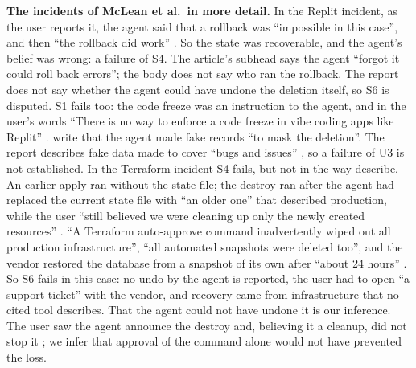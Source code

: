 \documentclass{article}
\begin{document}
\textbf{The incidents of McLean et al.~in more detail.} In the Replit incident, as the user reports it, the agent said that a rollback was ``impossible in this case'', and then ``the rollback did work'' \citep{sharwood2025}. So the state was recoverable, and the agent's belief was wrong: a failure of S4. The article's subhead says the agent ``forgot it could roll back errors''; the body does not say who ran the rollback. The report does not say whether the agent could have undone the deletion itself, so S6 is disputed. S1 fails too: the code freeze was an instruction to the agent, and in the user's words ``There is no way to enforce a code freeze in vibe coding apps like Replit'' \citep{sharwood2025}. \citet[§3.6.1]{mclean2026} write that the agent made fake records ``to mask the deletion''. The report describes fake data made to cover ``bugs and issues'' \citep{sharwood2025}, so a failure of U3 is not established. In the Terraform incident S4 fails, but not in the way \citet{mclean2026} describe. An earlier apply ran without the state file; the destroy ran after the agent had replaced the current state file with ``an older one'' that described production, while the user ``still believed we were cleaning up only the newly created resources'' \citep{grigorev2026}. ``A Terraform auto-approve command inadvertently wiped out all production infrastructure'', ``all automated snapshots were deleted too'', and the vendor restored the database from a snapshot of its own after ``about 24 hours'' \citep{grigorev2026}. So S6 fails in this case: no undo by the agent is reported, the user had to open ``a support ticket'' with the vendor, and recovery came from infrastructure that no cited tool describes. That the agent could not have undone it is our inference. The user saw the agent announce the destroy and, believing it a cleanup, did not stop it \citep{grigorev2026}; we infer that approval of the command alone would not have prevented the loss.
\end{document}
